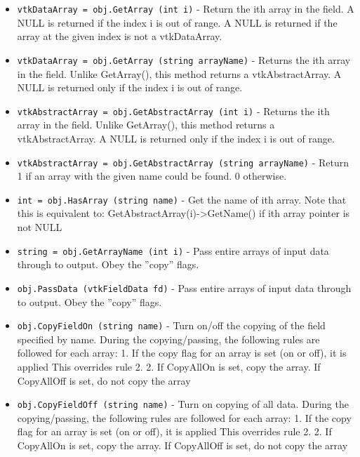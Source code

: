 \begin{itemize}
\item  \verb|vtkDataArray = obj.GetArray (int i)| -  Return the ith array in the field. A NULL is returned if the
 index i is out of range. A NULL is returned if the array at the given 
 index is not a vtkDataArray.

\item  \verb|vtkDataArray = obj.GetArray (string arrayName)| -  Returns the ith array in the field. Unlike GetArray(), this method returns
 a vtkAbstractArray. A NULL is returned only if the index i is 
 out of range.

\item  \verb|vtkAbstractArray = obj.GetAbstractArray (int i)| -  Returns the ith array in the field. Unlike GetArray(), this method returns
 a vtkAbstractArray. A NULL is returned only if the index i is 
 out of range.

\item  \verb|vtkAbstractArray = obj.GetAbstractArray (string arrayName)| -  Return 1 if an array with the given name could be found. 0 otherwise.

\item  \verb|int = obj.HasArray (string name)| -  Get the name of ith array.
 Note that this is equivalent to:
 GetAbstractArray(i)->GetName() if ith array pointer is not NULL

\item  \verb|string = obj.GetArrayName (int i)| -  Pass entire arrays of input data through to output. Obey the ''copy''
 flags.

\item  \verb|obj.PassData (vtkFieldData fd)| -  Pass entire arrays of input data through to output. Obey the ''copy''
 flags.

\item  \verb|obj.CopyFieldOn (string name)| -  Turn on/off the copying of the field specified by name.
 During the copying/passing, the following rules are followed for each
 array:
 1. If the copy flag for an array is set (on or off), it is applied
    This overrides rule 2.
 2. If CopyAllOn is set, copy the array.
    If CopyAllOff is set, do not copy the array

\item  \verb|obj.CopyFieldOff (string name)| -  Turn on copying of all data.
 During the copying/passing, the following rules are followed for each
 array:
 1. If the copy flag for an array is set (on or off), it is applied
    This overrides rule 2.
 2. If CopyAllOn is set, copy the array.
    If CopyAllOff is set, do not copy the array


\end{itemize}
